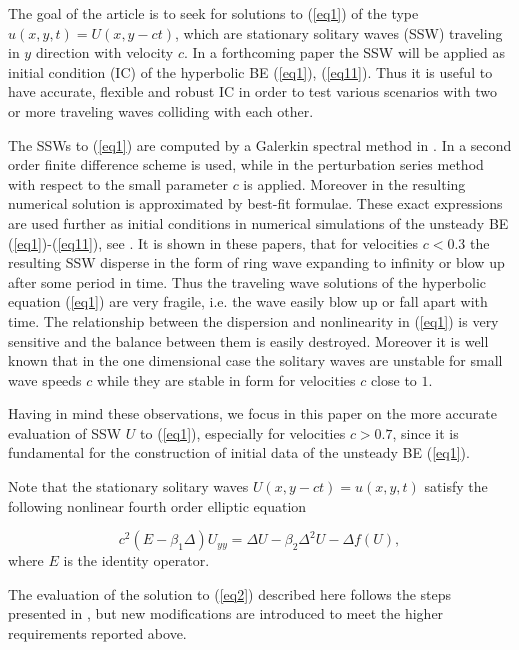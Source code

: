 \documentclass[leqno,11pt]{book}
\newcommand{\rf}[1]{(\ref{#1})}
\begin{document}
The goal of the article is to seek for solutions to (\ref{eq1}) of the type $u(x,y,t)=U(x,y-ct)$, which 
are stationary solitary waves (SSW) traveling  in $y$ direction with velocity $c$. In a forthcoming paper the SSW will be applied as initial condition (IC) of the hyperbolic BE \rf{eq1}, \rf{eq11}. Thus it is useful to have accurate, flexible 
and robust IC in order to test various scenarios with two or more traveling waves colliding with each other.

The SSWs to \rf{eq1} are computed by a Galerkin spectral method in \cite{chr-chr-07,chr-chr}.
In \cite{Ch2012} a second order  finite difference scheme is used, while in \cite{Ch2011} 
the perturbation series method with respect to the small parameter $c$ is applied.  Moreover in \cite{Ch2011} 
the resulting numerical solution is approximated by best-fit formulae. These exact expressions are used further as initial conditions in 
numerical simulations of the unsteady BE \rf{eq1}-\rf{eq11}, see  \cite{cher,dani}. It is shown in these papers, 
that for velocities $c<0.3$ the resulting SSW disperse in the form of ring wave expanding to infinity or blow up after some period in time. 
Thus the traveling wave solutions of the hyperbolic equation  \rf{eq1} are very fragile, i.e. the wave easily blow up or fall apart with time. 
The relationship between the dispersion and nonlinearity in \rf{eq1} is very sensitive  and the balance between them is easily destroyed.
Moreover it is well known  that in the one dimensional case the solitary waves are unstable  
for small wave speeds $c$ while they are stable in form for  velocities $c$ close to $1$. 

Having in mind these  observations, we focus in this paper on the more accurate evaluation of SSW $U$ to \rf{eq1}, especially for  velocities $c > 0.7$, since it is fundamental for the construction of initial data of the unsteady BE \rf{eq1}. 

Note that the stationary solitary waves $U(x,y-ct)=u(x,y,t)$
 satisfy the following nonlinear fourth order elliptic equation

\begin{equation}\label{eq2}
c^2 (E-\beta_1 \Delta) U_{yy} = \Delta U -\beta_2 \Delta^2 U - \Delta f(U),
\end{equation}
where $E$ is the identity operator. 

The evaluation of the solution to \rf{eq2} described here follows the steps presented in \cite{Ch2012},
but new modifications are introduced to meet the higher requirements reported above.
\end{document}
